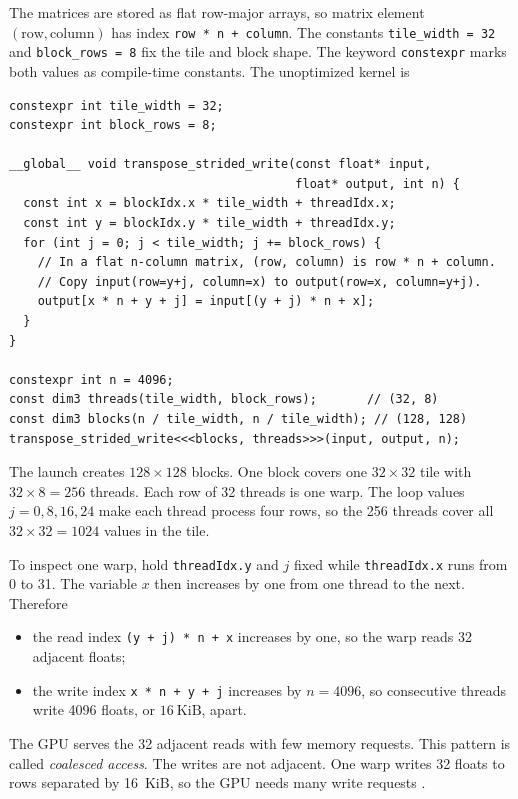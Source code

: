 \documentclass[11pt]{article}
\numberwithin{equation}{section}
\numberwithin{figure}{section}
\numberwithin{table}{section}
\newcommand{\code}[1]{\texttt{#1}}
\begin{document}
The matrices are stored as flat row-major arrays, so matrix element
$(\text{row},\text{column})$ has index \code{row * n + column}.  The constants
\code{tile\_width = 32} and \code{block\_rows = 8} fix the tile and block shape.
The keyword \code{constexpr} marks both values as compile-time constants.  The
unoptimized kernel is
\begin{lstlisting}[language=CUDA,caption={One $32\times32$ matrix tile per $32\times8$-thread block.}]
constexpr int tile_width = 32;
constexpr int block_rows = 8;

__global__ void transpose_strided_write(const float* input,
                                        float* output, int n) {
  const int x = blockIdx.x * tile_width + threadIdx.x;
  const int y = blockIdx.y * tile_width + threadIdx.y;
  for (int j = 0; j < tile_width; j += block_rows) {
    // In a flat n-column matrix, (row, column) is row * n + column.
    // Copy input(row=y+j, column=x) to output(row=x, column=y+j).
    output[x * n + y + j] = input[(y + j) * n + x];
  }
}

constexpr int n = 4096;
const dim3 threads(tile_width, block_rows);       // (32, 8)
const dim3 blocks(n / tile_width, n / tile_width); // (128, 128)
transpose_strided_write<<<blocks, threads>>>(input, output, n);
\end{lstlisting}

The launch creates $128\times128$ blocks.  One block covers one $32\times32$ tile
with $32\times8=256$ threads.  Each row of 32 threads is one warp.  The loop values
$j=0,8,16,24$ make each thread process four rows, so the 256 threads cover all
$32\times32=1024$ values in the tile.

To inspect one warp, hold \code{threadIdx.y} and $j$ fixed while
\code{threadIdx.x} runs from 0 to 31.  The variable $x$ then increases by one from
one thread to the next.  Therefore
\begin{itemize}
  \item the read index \code{(y + j) * n + x} increases by one, so the warp reads
  32 adjacent floats;
  \item the write index \code{x * n + y + j} increases by $n=4096$, so consecutive
  threads write 4096 floats, or $16\ \mathrm{KiB}$, apart.
\end{itemize}
The GPU serves the 32 adjacent reads with few memory requests.  This pattern is
called \emph{coalesced access}.  The writes are not adjacent.  One warp writes 32
floats to rows separated by 16~KiB, so the GPU needs many write requests
\cite{cuda-programming-guide,cuda-best-practices}.
\end{document}

